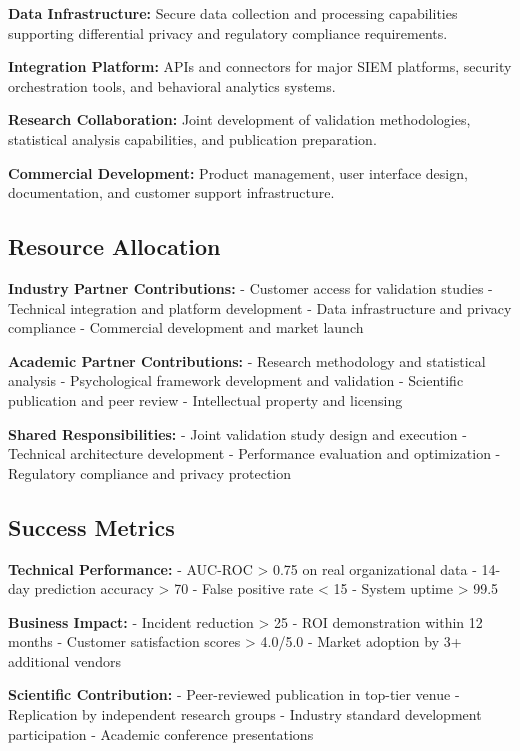 \documentclass[10pt,twocolumn]{IEEEtran}
\begin{document}
\textbf{Data Infrastructure:} Secure data collection and processing capabilities supporting differential privacy and regulatory compliance requirements.

\textbf{Integration Platform:} APIs and connectors for major SIEM platforms, security orchestration tools, and behavioral analytics systems.

\textbf{Research Collaboration:} Joint development of validation methodologies, statistical analysis capabilities, and publication preparation.

\textbf{Commercial Development:} Product management, user interface design, documentation, and customer support infrastructure.

\subsection{Resource Allocation}

\textbf{Industry Partner Contributions:}
- Customer access for validation studies
- Technical integration and platform development
- Data infrastructure and privacy compliance
- Commercial development and market launch

\textbf{Academic Partner Contributions:}
- Research methodology and statistical analysis
- Psychological framework development and validation
- Scientific publication and peer review
- Intellectual property and licensing

\textbf{Shared Responsibilities:}
- Joint validation study design and execution
- Technical architecture development
- Performance evaluation and optimization
- Regulatory compliance and privacy protection

\subsection{Success Metrics}

\textbf{Technical Performance:}
- AUC-ROC > 0.75 on real organizational data
- 14-day prediction accuracy > 70%
- False positive rate < 15%
- System uptime > 99.5%

\textbf{Business Impact:}
- Incident reduction > 25%
- ROI demonstration within 12 months
- Customer satisfaction scores > 4.0/5.0
- Market adoption by 3+ additional vendors

\textbf{Scientific Contribution:}
- Peer-reviewed publication in top-tier venue
- Replication by independent research groups
- Industry standard development participation
- Academic conference presentations
\end{document}
